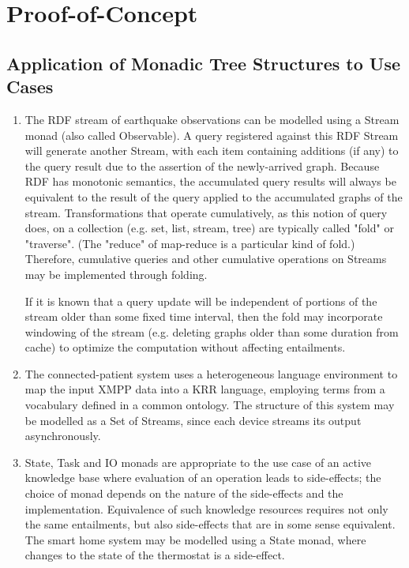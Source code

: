 \documentclass[runningheads]{llncs}
\begin{document}

\section{Proof-of-Concept}

\subsection{Application of Monadic Tree Structures to Use Cases}
\begin{enumerate}
\item The RDF stream of earthquake observations can be modelled using a Stream monad (also called Observable).
A query registered against this RDF Stream will generate another Stream, with each item containing additions (if any) to the query result due to the assertion of the newly-arrived graph.
Because RDF has monotonic semantics, the accumulated query results will always be equivalent to the result of the query applied to the accumulated graphs of the stream.
Transformations that operate cumulatively, as this notion of query does, on a collection (e.g. set, list, stream, tree) are typically called "fold" or "traverse". (The "reduce" of map-reduce is a particular kind of fold.)
Therefore, cumulative queries and other cumulative operations on Streams may be implemented through folding.

If it is known that a query update will be independent of portions of the stream older than some fixed time interval, then
the fold may incorporate windowing of the stream (e.g. deleting graphs older than some duration from cache) to optimize the computation without affecting entailments.

\item The connected-patient system uses a heterogeneous language environment to map the input XMPP data into a KRR language, employing terms from a vocabulary defined in a common ontology. The structure of this system may be modelled as a Set of Streams, since each device streams its output asynchronously.

\item State, Task and IO monads are appropriate to the use case of an active knowledge base where evaluation of an operation leads to side-effects; the choice of monad depends on the nature of the side-effects and the implementation.
Equivalence of such knowledge resources requires not only the same entailments, but also side-effects that are in some sense equivalent.
The smart home system may be modelled using a State monad, where changes to the state of the thermostat is a side-effect.


\end{enumerate}
\end{document}
